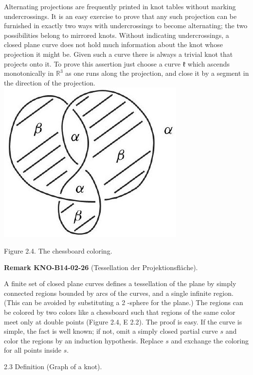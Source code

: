 \documentclass[10pt, letterpaper]{article}
\newcommand{\CustomHeading}[3]{%
  \par\medskip\noindent%
  \textbf{#1 #2} \textnormal{(#3)}.\enskip%
}
\newenvironment{REM}[2]{\begin{unitbox}\CustomHeading{Remark}{#1}{#2}}{\end{unitbox}}
\begin{document}
Alternating projections are frequently printed in knot tables without marking undercrossings. It is an easy exercise to prove that any such projection can be furnished in exactly two ways with undercrossings to become alternating; the two possibilities belong to mirrored knots. Without indicating undercrossings, a closed plane curve does not hold much information about the knot whose projection it might be. Given such a curve there is always a trivial knot that projects onto it. To prove this assertion just choose a curve $\mathfrak{k}$ which ascends monotonically in $\mathbb{R}^{3}$ as one runs along the projection, and close it by a segment in the direction of the projection.\\
\includegraphics[scale=0.2, center]{2025_05_21_9c06be8de7a55410f8c1g-032(1)}

Figure 2.4. The chessboard coloring.

\begin{REM}{KNO-B14-02-26}{Tessellation der Projektionsfläche}
A finite set of closed plane curves defines a tessellation of the plane by simply connected regions bounded by arcs of the curves, and a single infinite region. (This can be avoided by substituting a 2 -sphere for the plane.) The regions can be colored by two colors like a chessboard such that regions of the same color meet only at double points (Figure 2.4, E 2.2). The proof is easy. If the curve is simple, the fact is well known; if not, omit a simply closed partial curve $s$ and color the regions by an induction hypothesis. Replace $s$ and exchange the coloring for all points inside $s$.
\end{REM}


2.3 Definition (Graph of a knot). 
\end{document}
